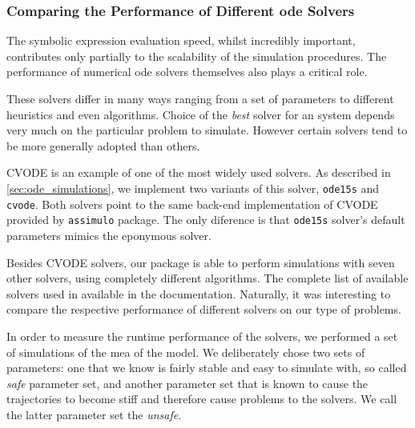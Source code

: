 \subsubsection{Comparing the Performance of Different \gls{ode} Solvers}

The symbolic expression evaluation speed, whilst incredibly important, contributes only partially to the scalability of the simulation procedures.
The performance of numerical \gls{ode} solvers themselves also plays a critical role.

These solvers differ in many ways ranging from a set of parameters to different heuristics and even algorithms.
Choice of the \emph{best} solver for an  system depends very much on the particular problem to simulate.
However certain solvers tend to be more generally adopted than others\cite{andersson_workbench_2012}.

CVODE\cite{hindmarsh_sundials_2005} is an example of one of the most widely used solvers.
As described in \autoref{sec:ode_simulations}, we implement two variants of this solver, \verb#ode15s# and \verb#cvode#.
Both solvers point to the same back-end implementation of CVODE provided by \verb#assimulo# package\cite{andersson_christian_assimulo:_????}.
The only diference is that \verb#ode15s# solver's default parameters mimics the eponymous \mat{} solver.

Besides CVODE solvers, our package is able to perform simulations with seven other solvers, using completely different algorithms.
The complete list of available solvers used in available in the documentation.
Naturally, it was interesting to compare the respective performance of different solvers on our type of problems.

In order to measure the runtime performance of the solvers, we performed a set of simulations of the \acrlong{mea} of the \pft{} model.
We deliberately chose two sets of parameters: one that we know is fairly stable and easy to simulate with, so called \emph{safe} parameter set,
and another parameter set that is known to cause the trajectories to become stiff and therefore cause problems to the solvers.
We call the latter parameter set the \emph{unsafe}.
 
